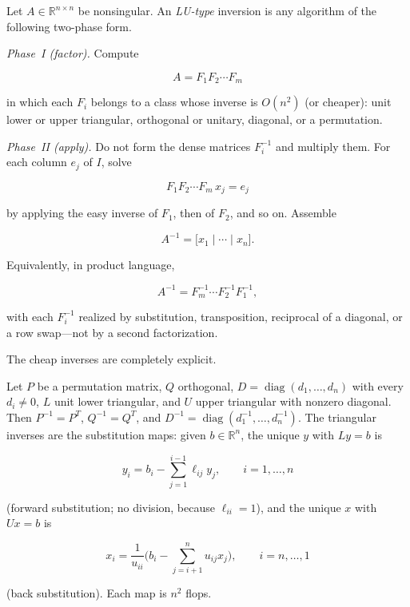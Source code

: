 \begin{construction}
\label{con:lu-type}
Let \(A\in\mathbb{R}^{n\times n}\) be nonsingular. An \emph{LU-type} inversion is any algorithm of the following two-phase form.

\emph{Phase~I (factor).} Compute

\[
A = F_{1} F_{2} \cdots F_{m}
\]

in which each \(F_{i}\) belongs to a class whose inverse is \(O(n^{2})\) (or cheaper): unit lower or upper triangular, orthogonal or unitary, diagonal, or a permutation.

\emph{Phase~II (apply).} Do not form the dense matrices \(F_{i}^{-1}\) and multiply them. For each column \(e_{j}\) of \(I\), solve

\[
F_{1} F_{2} \cdots F_{m}\, x_{j} = e_{j}
\]

by applying the easy inverse of \(F_{1}\), then of \(F_{2}\), and so on. Assemble

\[
A^{-1}
=
\bigl[ x_{1} \mid \cdots \mid x_{n} \bigr].
\]

Equivalently, in product language,

\[
A^{-1}
=
F_{m}^{-1} \cdots F_{2}^{-1} F_{1}^{-1},
\]

with each \(F_{i}^{-1}\) realized by substitution, transposition, reciprocal of a diagonal, or a row swap---not by a second factorization.
\end{construction}

The cheap inverses are completely explicit.

\begin{lemma}
\label{lem:easy-inv}
Let \(P\) be a permutation matrix, \(Q\) orthogonal, \(D=\operatorname{diag}(d_{1},\ldots,d_{n})\) with every \(d_{i}\neq 0\), \(L\) unit lower triangular, and \(U\) upper triangular with nonzero diagonal. Then \(P^{-1}=P^{T}\), \(Q^{-1}=Q^{T}\), and \(D^{-1}=\operatorname{diag}(d_{1}^{-1},\ldots,d_{n}^{-1})\). The triangular inverses are the substitution maps: given \(b\in\mathbb{R}^{n}\), the unique \(y\) with \(Ly=b\) is

\[
y_{i}
=
b_{i}
-
\sum_{j=1}^{i-1} \ell_{ij} y_{j},
\qquad
i=1,\ldots,n
\]

(forward substitution; no division, because \(\ell_{ii}=1\)), and the unique \(x\) with \(Ux=b\) is

\[
x_{i}
=
\frac{1}{u_{ii}}
\Biggl(
b_{i}
-
\sum_{j=i+1}^{n} u_{ij} x_{j}
\Biggr),
\qquad
i=n,\ldots,1
\]

(back substitution). Each map is \(n^{2}\) flops.
\end{lemma}

